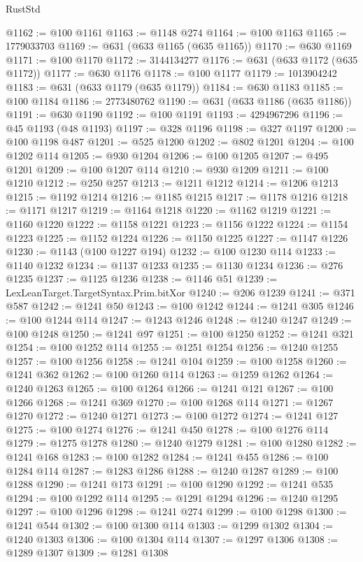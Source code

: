 \begin{lexlean}{RustStd}
\begin{coremodule}
@1162 := @100 @1161
@1163 := @1148 @274
@1164 := @100 @1163
@1165 := 1779033703
@1169 := @631 (@633 @1165 (@635 @1165))
@1170 := @630 @1169
@1171 := @100 @1170
@1172 := 3144134277
@1176 := @631 (@633 @1172 (@635 @1172))
@1177 := @630 @1176
@1178 := @100 @1177
@1179 := 1013904242
@1183 := @631 (@633 @1179 (@635 @1179))
@1184 := @630 @1183
@1185 := @100 @1184
@1186 := 2773480762
@1190 := @631 (@633 @1186 (@635 @1186))
@1191 := @630 @1190
@1192 := @100 @1191
@1193 := 4294967296
@1196 := @45 @1193 (@48 @1193)
@1197 := @328 @1196
@1198 := @327 @1197
@1200 := @100 @1198 @487
@1201 := @525 @1200
@1202 := @802 @1201
@1204 := @100 @1202 @114
@1205 := @930 @1204
@1206 := @100 @1205
@1207 := @495 @1201
@1209 := @100 @1207 @114
@1210 := @930 @1209
@1211 := @100 @1210
@1212 := @250 @257
@1213 := @1211 @1212
@1214 := @1206 @1213
@1215 := @1192 @1214
@1216 := @1185 @1215
@1217 := @1178 @1216
@1218 := @1171 @1217
@1219 := @1164 @1218
@1220 := @1162 @1219
@1221 := @1160 @1220
@1222 := @1158 @1221
@1223 := @1156 @1222
@1224 := @1154 @1223
@1225 := @1152 @1224
@1226 := @1150 @1225
@1227 := @1147 @1226
@1230 := @1143 (@100 @1227 @194)
@1232 := @100 @1230 @114
@1233 := @1140 @1232
@1234 := @1137 @1233
@1235 := @1130 @1234
@1236 := @276 @1235
@1237 := @1125 @1236
@1238 := @1146 @51
@1239 := LexLeanTarget.TargetSyntax.Prim.bitXor
@1240 := @206 @1239
@1241 := @371 @587
@1242 := @1241 @50
@1243 := @100 @1242
@1244 := @1241 @305
@1246 := @100 @1244 @114
@1247 := @1243 @1246
@1248 := @1240 @1247
@1249 := @100 @1248
@1250 := @1241 @97
@1251 := @100 @1250
@1252 := @1241 @321
@1254 := @100 @1252 @114
@1255 := @1251 @1254
@1256 := @1240 @1255
@1257 := @100 @1256
@1258 := @1241 @104
@1259 := @100 @1258
@1260 := @1241 @362
@1262 := @100 @1260 @114
@1263 := @1259 @1262
@1264 := @1240 @1263
@1265 := @100 @1264
@1266 := @1241 @121
@1267 := @100 @1266
@1268 := @1241 @369
@1270 := @100 @1268 @114
@1271 := @1267 @1270
@1272 := @1240 @1271
@1273 := @100 @1272
@1274 := @1241 @127
@1275 := @100 @1274
@1276 := @1241 @450
@1278 := @100 @1276 @114
@1279 := @1275 @1278
@1280 := @1240 @1279
@1281 := @100 @1280
@1282 := @1241 @168
@1283 := @100 @1282
@1284 := @1241 @455
@1286 := @100 @1284 @114
@1287 := @1283 @1286
@1288 := @1240 @1287
@1289 := @100 @1288
@1290 := @1241 @173
@1291 := @100 @1290
@1292 := @1241 @535
@1294 := @100 @1292 @114
@1295 := @1291 @1294
@1296 := @1240 @1295
@1297 := @100 @1296
@1298 := @1241 @274
@1299 := @100 @1298
@1300 := @1241 @544
@1302 := @100 @1300 @114
@1303 := @1299 @1302
@1304 := @1240 @1303
@1306 := @100 @1304 @114
@1307 := @1297 @1306
@1308 := @1289 @1307
@1309 := @1281 @1308

\end{coremodule}
\end{lexlean}
